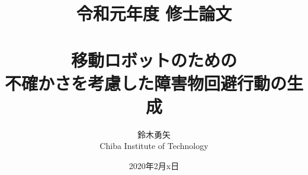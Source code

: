 \documentclass[a4paper,12pt,uplatex]{jsbook}
\begin{document}
\title{令和元年度 修士論文\\
　\\
移動ロボットのための\\
不確かさを考慮した障害物回避行動の生成}
\author{鈴木勇矢\\
Chiba Institute of Technology}
\date{2020年2月x日}

\maketitle
% 

\tableofcontents

\cleardoublepage
{}

% 
% 
% 
% 
% 
% 











\newpage
\printindex
\end{document}
